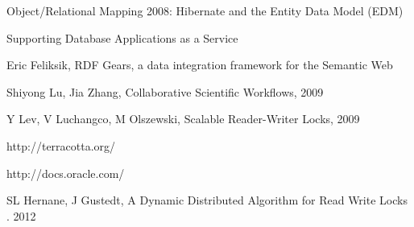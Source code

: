 \documentclass[a4paper, notitlepage]{article}
\begin{document}
\begin{thebibliography}{99}

 Object/Relational Mapping 2008: Hibernate and the Entity Data Model (EDM)

 Supporting Database Applications as a Service

 Eric Feliksik, RDF Gears, a data integration framework for the Semantic Web

 Shiyong Lu, Jia Zhang, Collaborative Scientific Workflows, 2009

 Y Lev, V Luchangco, M Olszewski, Scalable Reader-Writer Locks, 2009

 http://terracotta.org/

 http://docs.oracle.com/

 SL Hernane, J Gustedt, A Dynamic Distributed Algorithm for Read Write Locks . 2012

\end{thebibliography}
\end{document}
